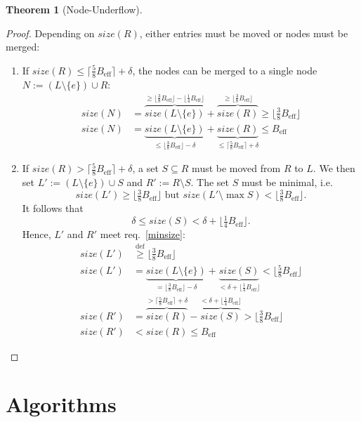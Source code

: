 \documentclass[a4paper, 8pt]{scrartcl}
\theoremstyle{plain}
\theoremstyle{definition}
\newtheorem{thm}{Theorem}[section]
\theoremstyle{remark}
\newcommand \Beff { B_{\text{eff}} }
\begin{document}
\begin{multicols}{2}
\begin{thm}[Node-Underflow]
\begin{proof}
Depending on $size(R)$, either entries must be moved or nodes must be merged:
\begin{enumerate}
\item If \mbox{$size(R) \leq \lceil \frac{5}{8} \Beff \rceil + \delta$},
the nodes can be merged to a single node
\mbox{$N := (L \setminus \{e\}) \cup R$}:
\begin{align*}
size(N)
	&= \overbrace{size(L \setminus \{e\})}^{
			\geq \lfloor \frac{3}{8} \Beff \rfloor 
				- \lfloor \frac{1}{4} \Beff \rfloor}
		+ \overbrace{size(R)}^{
			\geq \lfloor \frac{3}{8} \Beff \rfloor}
	\geq \lfloor \tfrac{3}{8} \Beff \rfloor\\
size(N)
	&= \underbrace{size(L \setminus \{e\})}_{
			\leq \lfloor \frac{3}{8} \Beff \rfloor - \delta}
		+ \underbrace{size(R)}_{
			\leq \lceil \frac{5}{8} \Beff \rceil + \delta}
	\leq \Beff
\end{align*}

\item
If \mbox{$size(R) > \lceil \frac{5}{8} \Beff \rceil + \delta$}, a set
\mbox{$S \subseteq R$} must be moved from $R$ to $L$.
We then set \mbox{$L' := (L \setminus \{e\}) \cup S$} and
\mbox{$R' := R \setminus S$}.
The set $S$ must be minimal, i.e.
\[ size(L') \geq \lfloor \tfrac{3}{8} \Beff \rfloor \text{ but }
	size(L' \setminus \max S) < \lfloor \tfrac{3}{8} \Beff \rfloor. \]
It follows that
\[ \delta \leq size(S) < \delta + \lfloor \tfrac{1}{4} \Beff \rfloor. \]
Hence, $L'$ and $R'$ meet req.~\ref{minsize}:
\begin{align*}
size(L')
	&\stackrel{\mathrm{def}}{\geq} \lfloor \tfrac{3}{8} \Beff \rfloor\\
size(L')
	&= \underbrace{size(L \setminus \{e\})}_{
			= \lfloor \frac{3}{8} \Beff \rfloor - \delta}
		+ \underbrace{size(S)}_{
			< \delta + \lfloor \frac{1}{4} \Beff \rfloor}
	< \lfloor \tfrac{5}{8} \Beff \rfloor\\
size(R')
	&= \overbrace{size(R)}^{
			> \lceil \frac{5}{8} \Beff \rceil + \delta}
		- \overbrace{size(S)}^{
			< \delta + \lfloor \frac{1}{4} \Beff \rfloor}
	> \lfloor \tfrac{3}{8} \Beff \rfloor\\
size(R')
	&< size(R) \leq \Beff
\end{align*}
\end{enumerate}
\end{proof}
\end{thm}



\section{Algorithms} %


\end{multicols}
\end{document}

